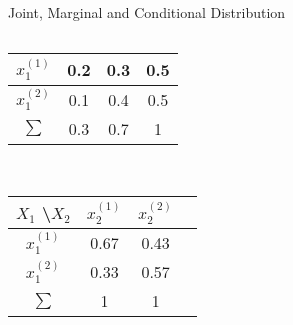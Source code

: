 \documentclass[11pt,compress,t,notes=noshow, aspectratio=169, xcolor=table]{beamer}
\begin{document}
\begin{frame}{Joint, Marginal and Conditional Distribution}
\begin{columns}[c, totalwidth=\textwidth]
\begin{column}{0.5\linewidth}
\begin{table}
\begin{tabular}{|c|c|c|c|}
            \hline
            $x_1^{(1)}$ & 0.2 & 0.3 & \cellcolor{gray}0.5  \\
            \hline
            $x_1^{(2)}$ & 0.1 & 0.4 & \cellcolor{gray}0.5  \\
            \hline
            $\sum$ & 0.3 & 0.7 & 1  \\
            \hline
        \end{tabular}\\
        \bigskip
        \begin{tabular}{|c|c|c|c|}
            \hline 
            $X_1$ \textbackslash $X_2$ & $x_2^{(1)}$ & $x_2^{(2)}$  \\
            \hline
            $x_1^{(1)}$ & \cellcolor{gray} 0.67 & \cellcolor{gray}0.43   \\
            \hline
            $x_1^{(2)}$ & \cellcolor{gray} 0.33 & \cellcolor{gray}0.57   \\
            \hline
            $\sum$ & 1 & 1  \\
            \hline
        \end{tabular}
    \end{table}
    \end{column}
    \end{columns} 
    
\end{frame}
\end{document}
